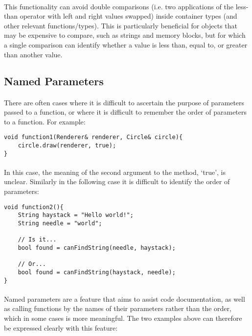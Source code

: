 \documentclass[12pt,twoside,notitlepage]{report}
\begin{document}
\paragraph{}
This functionality can avoid double comparisons (i.e. two applications of the less-than operator with left and right values swapped) inside container types (and other relevant functions/types). This is particularly beneficial for objects that may be expensive to compare, such as strings and memory blocks, but for which a single comparison can identify whether a value is less than, equal to, or greater than another value.

\clearpage

\subsection{Named Parameters}

\paragraph{}
There are often cases where it is difficult to ascertain the purpose of parameters passed to a function, or where it is difficult to remember the order of parameters to a function. For example:


\begin{lstlisting}
void function1(Renderer& renderer, Circle& circle){
	circle.draw(renderer, true);
}
\end{lstlisting}


\paragraph{}
In this case, the meaning of the second argument to the method, `true', is unclear. Similarly in the following case it is difficult to identify the order of parameters:


\begin{lstlisting}
void function2(){
	String haystack = "Hello world!";
	String needle = "world";
	
	// Is it...
	bool found = canFindString(needle, haystack);
	
	// Or...
	bool found = canFindString(haystack, needle);
}
\end{lstlisting}


\paragraph{}
Named parameters are a feature that aims to assist code documentation, as well as calling functions by the names of their parameters rather than the order, which in some cases is more meaningful. The two examples above can therefore be expressed clearly with this feature:
\end{document}
